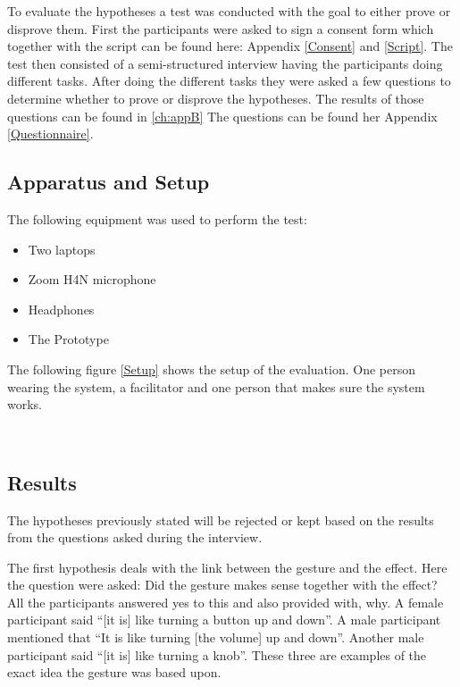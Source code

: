 To evaluate the hypotheses a test was conducted with the goal to either prove or disprove them. First the participants were asked to sign a consent form which together with the script can be found here: Appendix \ref{Consent} and \ref{Script}. The test then consisted of a semi-structured interview having the participants doing different tasks. After doing the different tasks they were asked a few questions to determine whether to prove or disprove the hypotheses. The results of those questions can be found in \ref{ch:appB} The questions can be found her Appendix \ref{Questionnaire}. 

\subsection{Apparatus and Setup}

The following equipment was used to perform the test:
\begin{itemize}
 \item Two laptops
 \item Zoom H4N microphone 
 \item Headphones
 \item The Prototype
\end{itemize}

The following figure \ref{Setup} shows the setup of the evaluation. One person wearing the system, a facilitator and one person that makes sure the system works. 

\begin{minipage}{\linewidth}%
\label{Setup}
\end{minipage}\\

\subsection{Results}
The hypotheses previously stated will be rejected or kept based on the results from the questions asked during the interview.

The first hypothesis deals with the link between the gesture and the effect. Here the question were asked: Did the gesture makes sense together with the effect? All the participants answered yes to this and also provided with, why. A female participant said “[it is] like turning a button up and down”. A male participant mentioned that “It is like turning [the volume] up and down”. Another male participant said “[it is] like turning a knob”. These three are examples of the exact idea the gesture was based upon. 

